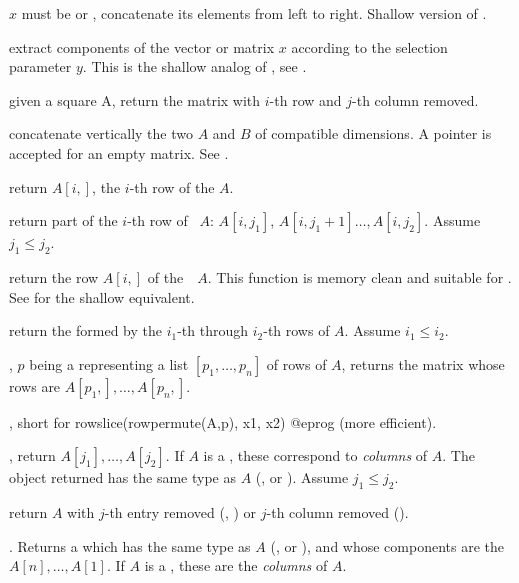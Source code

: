 $x$ must be  or , concatenate
its elements from left to right. Shallow version of .

 extract components
of the vector or matrix $x$ according to the selection parameter $y$.
This is the shallow analog of , see .

 given a square  A,
return the matrix with $i$-th row and $j$-th column removed.

 concatenate vertically the two  $A$
and $B$ of compatible dimensions. A  pointer is accepted for an
empty matrix. See .

 return $A[i,]$, the $i$-th row of the 
$A$.

 return part of the $i$-th
row of ~$A$: $A[i,j_1]$, $A[i,j_1+1]\dots,A[i,j_2]$. Assume $j_1
\leq j_2$.

 return the row $A[i,]$ of
the~~$A$. This function is memory clean and suitable for
. See  for the shallow equivalent.

 return the 
formed by the $i_1$-th through $i_2$-th rows of  $A$. Assume $i_1
\leq i_2$.

, $p$ being a 
representing a list $[p_1,\dots,p_n]$ of rows of  $A$, returns the
matrix whose rows are $A[p_1,],\dots, A[p_n,]$.

, short for
\bprog
  rowslice(rowpermute(A,p), x1, x2)
@eprog\noindent
(more efficient).

, return $A[j_1], \dots,
A[j_2]$. If $A$ is a , these correspond to \emph{columns} of $A$.
The object returned has the same type as $A$ (,  or
). Assume $j_1 \leq j_2$.

 return $A$ with $j$-th entry removed
(, ) or $j$-th column removed ().

. Returns a  which has the same
type as $A$ (,  or ), and whose components
are the $A[n],\dots,A[1]$. If $A$ is a , these are the
\emph{columns} of $A$.

